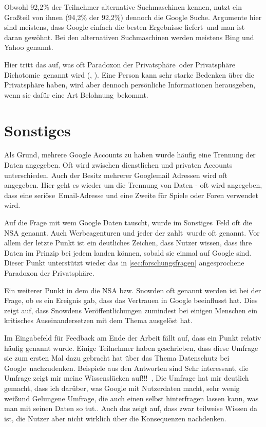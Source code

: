Obwohl 92,2\% der Teilnehmer alternative Suchmaschinen kennen, nutzt ein Großteil von ihnen (94,2\% der 92,2\%) dennoch die Google Suche. Argumente hier sind meistens, dass Google \glqq einfach die besten Ergebnisse liefert\grqq\ und \glqq man ist daran gewöhnt\grqq . Bei den alternativen Suchmaschinen werden meistens Bing und Yahoo genannt.

Hier tritt das auf, was oft \glqq Paradoxon der Privatsphäre\grqq\ oder \glqq Privatsphäre Dichotomie\grqq\ genannt wird (\citet{lbs2006}, \citet{privacyparadox2006}). Eine Person kann sehr starke Bedenken über die Privatsphäre haben, wird aber dennoch persönliche Informationen herausgeben, wenn sie dafür eine Art \glqq Belohnung\grqq\ bekommt.

\section{Sonstiges}
Als Grund, mehrere Google Accounts zu haben wurde häufig eine Trennung der Daten angegeben. Oft wird zwischen dienstlichen und privaten Accounts unterschieden. Auch der Besitz mehrerer Googlemail Adressen wird oft angegeben. Hier geht es wieder um die Trennung von Daten - oft wird angegeben, dass eine \glqq seriöse\grqq\ Email-Adresse und eine Zweite für Spiele oder Foren verwendet wird.

Auf die Frage mit wem Google Daten tauscht, wurde im \glqq Sonstiges\grqq\ Feld oft die NSA genannt. Auch Werbeagenturen und \glqq jeder der zahlt\grqq\ wurde oft genannt. Vor allem der letzte Punkt ist ein deutliches Zeichen, dass Nutzer wissen, dass ihre Daten im Prinzip bei jedem landen können, sobald sie einmal auf Google sind. Dieser Punkt unterstützt wieder das in \ref{sec:forschungsfragen} angesprochene Paradoxon der Privatsphäre. 

Ein weiterer Punkt in dem die NSA bzw. Snowden oft genannt werden ist bei der Frage, ob es ein Ereignis gab, dass das Vertrauen in Google beeinflusst hat. Dies zeigt auf, dass Snowdens Veröffentlichungen zumindest bei einigen Menschen ein kritisches Auseinandersetzen mit dem Thema ausgelöst hat.

Im Eingabefeld für Feedback am Ende der Arbeit fällt auf, dass ein Punkt relativ häufig genannt wurde. Einige Teilnehmer haben geschrieben, dass diese Umfrage sie zum ersten Mal dazu gebracht hat über das Thema \glqq Datenschutz bei Google\grqq\ nachzudenken. Beispiele aus den Antworten sind \glqq Sehr interessant, die Umfrage zeigt mir meine Wissenslücken auf!!!\grqq\ , \glqq Die Umfrage hat mir deutlich gemacht, dass ich darüber, was Google mit Nutzerdaten macht, sehr wenig weiß\grqq und \glqq Gelungene Umfrage, die auch einen selbst hinterfragen lassen kann, was man mit seinen Daten so tut.\grqq . Auch das zeigt auf, dass zwar teilweise Wissen da ist, die Nutzer aber nicht wirklich über die Konsequenzen nachdenken.
